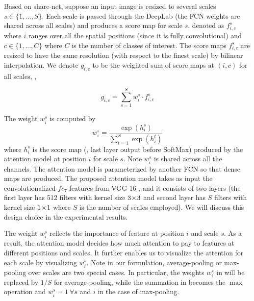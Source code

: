 Based on share-net, suppose an input image is resized to several scales $s \in \{1, ..., S\}$. Each scale is passed through the DeepLab (the FCN weights are shared across all scales) and produces a score map for scale $s$, denoted as $f^s_{i,c}$ where $i$ ranges over all the spatial positions (since it is fully convolutional) and $c \in \{1, ..., C\}$ where $C$ is the number of classes of interest. The score maps $f^s_{i,c}$ are resized to have the same resolution (with respect to the finest scale) by bilinear interpolation. We denote $g_{i,c}$ to be the weighted sum of score maps at $(i,c)$ for all scales, \ie,

\begin{equation}
\label{eq:weighted_sum}
g_{i,c} = \sum_{s=1}^S w^s_{i} \cdot f^s_{i,c}
\end{equation}

The weight $w^s_{i}$ is computed by
\begin{equation}
w^s_{i} = \frac{\exp(h^s_{i})}{\sum_{t=1}^S \exp(h^t_{i})}
\end{equation}
where $h^s_{i}$ is the score map (\ie, last layer output before SoftMax) produced by the attention model at position $i$ for scale $s$. Note $w^s_{i}$ is shared across all the channels. The attention model is parameterized by another FCN so that dense maps are produced. The proposed attention model takes as input the convolutionalized $fc_7$ features from VGG-16 \cite{simonyan2014very}, and it consists of two layers (the first layer has 512 filters with kernel size $3 \! \times \! 3$ and second layer has $S$ filters with kernel size $1 \! \times \! 1$ where $S$ is the number of scales employed). We will discuss this design choice in the experimental results.

The weight $w^s_{i}$ reflects the importance of feature at position $i$ and scale $s$. As a result, the attention model decides how much attention to pay to features at different positions and scales. It further enables us to visualize the attention for each scale by visualizing $w^s_{i}$. Note in our formulation, average-pooling or max-pooling over scales are two special cases. In particular, the weights $w^s_{i}$ in  will be replaced by $1/S$ for average-pooling, while the summation in  becomes the $\max$ operation and $w^s_{i}=1 \ \forall s $ and $i$ in the case of max-pooling.


